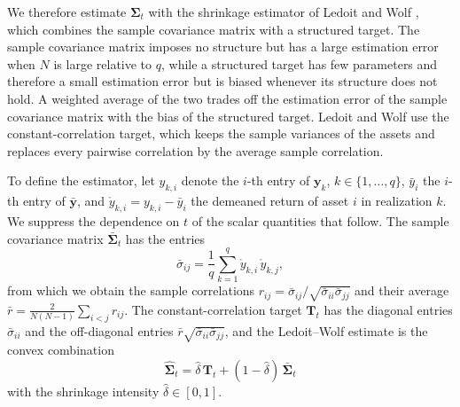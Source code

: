 We therefore estimate $\bm{\Sigma}_t$ with the shrinkage estimator of Ledoit and Wolf \cite{LedoitWolf2003}, which
combines the sample covariance matrix with a structured target. The sample covariance matrix imposes no structure but
has a large estimation error when $N$ is large relative to $q$, while a structured target has few parameters and
therefore a small estimation error but is biased whenever its structure does not hold. A weighted average of the two
trades off the estimation error of the sample covariance matrix with the bias of the structured target. Ledoit and Wolf use the constant-correlation
target, which keeps the sample variances of the assets and replaces every pairwise correlation by the average sample
correlation.

To define the estimator, let $y_{k,i}$ denote the $i$-th entry of $\bm{y}_k$, $k \in \{1, \ldots, q\}$, $\bar{y}_i$ the $i$-th entry of
$\bar{\bm{y}}$, and $\mathring{y}_{k,i} = y_{k,i} - \bar{y}_i$ the demeaned return of asset $i$ in realization $k$. We
suppress the dependence on $t$ of the scalar quantities that follow. The sample covariance matrix $\bar{\bm{\Sigma}}_t$
has the entries
\begin{equation*}
    \bar{\sigma}_{ij} = \frac{1}{q} \sum_{k=1}^q \mathring{y}_{k,i}\, \mathring{y}_{k,j},
\end{equation*}
from which we obtain the sample correlations $r_{ij} = \bar{\sigma}_{ij} / \sqrt{\bar{\sigma}_{ii} \bar{\sigma}_{jj}}$
and their average $\bar{r} = \frac{2}{N(N-1)} \sum_{i<j} r_{ij}$. The constant-correlation target $\bm{T}_t$ has the
diagonal entries $\bar{\sigma}_{ii}$ and the off-diagonal entries $\bar{r} \sqrt{\bar{\sigma}_{ii} \bar{\sigma}_{jj}}$,
and the Ledoit--Wolf estimate is the convex combination
\begin{equation*}
    \hat{\bm{\Sigma}}_t = \hat{\delta}\, \bm{T}_t + (1 - \hat{\delta})\, \bar{\bm{\Sigma}}_t
\end{equation*}
with the shrinkage intensity $\hat{\delta} \in [0, 1]$.

